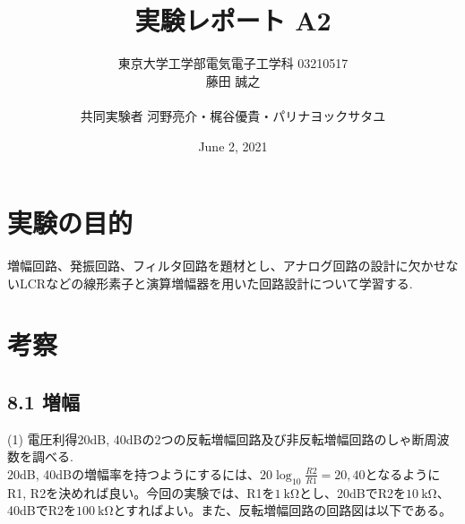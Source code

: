 \documentclass{ltjsarticle}
\title{実験レポート A2}
\author{東京大学工学部電気電子工学科 03210517\\藤田 誠之\\~\\ 共同実験者  河野亮介・梶谷優貴・パリナヨックサタユ}
\date{ June 2, 2021}
\begin{document}
\maketitle

\section{実験の目的}
増幅回路、発振回路、フィルタ回路を題材とし、アナログ回路の設計に欠かせないLCRなどの線形素子と演算増幅器を用いた回路設計について学習する.

\section{考察}
\subsection*{8.1 増幅}

(1) 電圧利得20dB, 40dBの2つの反転増幅回路及び非反転増幅回路のしゃ断周波数を調べる. \\
20dB, 40dBの増幅率を持つようにするには、$20\log_{10}\frac{R2}{R1} = 20, 40$となるようにR1, R2を決めれば良い。今回の実験では、R1を$\SI{1}{\kilo\ohm}$とし、20dBでR2を$\SI{10}{\kilo\ohm}$、40dBでR2を$\SI{100}{\kilo\ohm}$とすればよい。また、反転増幅回路の回路図は以下である。
\end{document}
